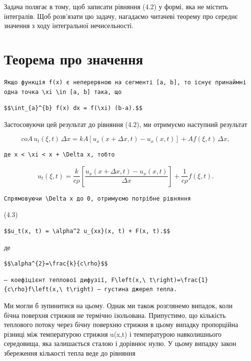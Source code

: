\documentclass[
  ukrainian,
]{article}
\begin{document}
Задача полягає в тому, щоб записати рівняння (4.2) у формі, яка не
містить інтегралів. Щоб розв'язати цю задачу, нагадаємо читачеві теорему
про середнє значення з ходу інтегральної нечисельності.

\section{Теорема про
значення}\label{ux442ux435ux43eux440ux435ux43cux430-ux43fux440ux43e-ux437ux43dux430ux447ux435ux43dux43dux44f}

\begin{verbatim}
Якщо функція f(x) є неперервною на сегменті [a, b], то існує принаймні одна точка \xi \in [a, b] така, що
\end{verbatim}

\begin{verbatim}
$$\int_{a}^{b} f(x) dx = f(\xi) (b-a).$$
\end{verbatim}

Застосовуючи цей результат до рівняння (4.2), ми отримуємо наступний
результат

\[
coA\,u_t(\xi, t)\,\Delta x = kA\left[u_x(x + \Delta x, t) - u_x(x, t)\right] + Af(\xi, t)\,\Delta x,
\]

\begin{verbatim}
де x < \xi < x + \Delta x, тобто
\end{verbatim}

\[
u_t(\xi, t) = \frac{k}{c\rho}\left[\frac{u_x(x + \Delta x, t) - u_x(x, t)}{\Delta x}\right] + \frac{1}{c\rho} f(\xi, t).
\]

\begin{verbatim}
Спрямовуючи \Delta x до 0, отримуємо потрібне рівняння
\end{verbatim}

(4.3)

\begin{verbatim}
$$u_t(x, t) = \alpha^2 u_{xx}(x, t) + F(x, t).$$
\end{verbatim}

де

\begin{verbatim}
$$\alpha^{2}=\frac{k}{c\rho}$$
\end{verbatim}

\begin{verbatim}
— коефіцієнт теплової дифузії, F\left(x,\ t\right)=\frac{1}{c\rho}f\left(x,\ t\right) — густина джерел тепла.
\end{verbatim}

Ми могли б зупинитися на цьому. Однак ми також розглянемо випадок, коли
бічна поверхня стрижня не термічно ізольована. Припустимо, що кількість
теплового потоку через бічну поверхню стрижня в цьому випадку
пропорційна різниці між температурою стрижня u(x,t) і температурою
навколишнього середовища, яка залишається сталою і дорівнює нулю. У
цьому випадку закон збереження кількості тепла веде до рівняння
\end{document}
